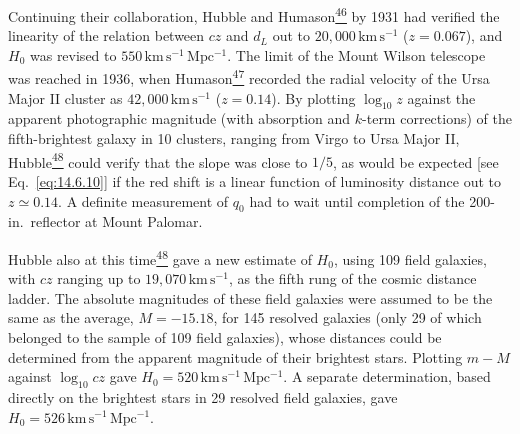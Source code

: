 Continuing their collaboration, Hubble and
Humason\hyperref[ch14-ref-46]{\textsuperscript{46}} by 1931 had verified the
linearity of the relation between \(cz\) and \(d_L\) out to
\(20{,}000\,\mathrm{km\,s^{-1}}\) (\(z=0.067\)), and \(H_0\) was revised to
\(550\,\mathrm{km\,s^{-1}\,Mpc^{-1}}\). The limit of the Mount Wilson
telescope was reached in 1936, when
Humason\hyperref[ch14-ref-47]{\textsuperscript{47}} recorded the radial
velocity of the Ursa Major II cluster as
\(42{,}000\,\mathrm{km\,s^{-1}}\) (\(z=0.14\)). By plotting
\(\log_{10}z\) against the apparent photographic magnitude (with absorption
and \(k\)-term corrections) of the fifth-brightest galaxy in 10 clusters,
ranging from Virgo to Ursa Major II,
Hubble\hyperref[ch14-ref-48]{\textsuperscript{48}} could verify that the
slope was close to \(1/5\), as would be expected [see
Eq.~\eqref{eq:14.6.10}] if the red shift is a linear function of luminosity
distance out to \(z\simeq0.14\). A definite measurement of \(q_0\) had to
wait until completion of the 200-in.\ reflector at Mount Palomar.

Hubble also at this time\hyperref[ch14-ref-48]{\textsuperscript{48}} gave a
new estimate of \(H_0\), using 109 field galaxies, with \(cz\) ranging up to
\(19{,}070\,\mathrm{km\,s^{-1}}\), as the fifth rung of the cosmic distance
ladder. The absolute magnitudes of these field galaxies were assumed to be
the same as the average, \(M=-15.18\), for 145 resolved galaxies (only 29 of
which belonged to the sample of 109 field galaxies), whose distances could
be determined from the apparent magnitude of their brightest stars. Plotting
\(m-M\) against \(\log_{10}cz\) gave
\(H_0=520\,\mathrm{km\,s^{-1}\,Mpc^{-1}}\). A separate determination,
based directly on the brightest stars in 29 resolved field galaxies, gave
\(H_0=526\,\mathrm{km\,s^{-1}\,Mpc^{-1}}\).

